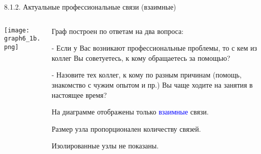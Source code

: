 \begin{frame}{8.1.2. Актуальные профессиональные связи (взаимные)}

\begin{columns}
\begin{column}{0.75\textwidth} 
\centering
          \texttt{[image: graph6\_1b.png]}
\end{column}
\begin{column}{0.25\textwidth} 

\tiny
Граф построен по ответам на два вопроса:
\smallskip

- Если у Вас возникают профессиональные проблемы, то с кем из коллег Вы советуетесь, к кому обращаетесь за помощью?
\smallskip

- Назовите тех коллег, к кому по разным причинам (помощь, знакомство с чужим опытом и пр.) Вы чаще ходите на занятия в настоящее время?
\smallskip

На диаграмме отображены только \textcolor{blue}{взаимные} связи.
\smallskip

Размер узла пропорционален количеству связей.
\smallskip

Изолированные узлы не показаны.
\end{column}
\end{columns}
\end{frame}


